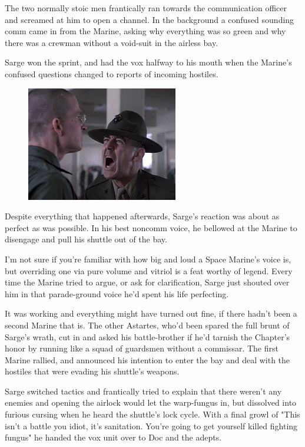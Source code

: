 The two normally stoic men frantically ran towards the communication officer and screamed at him to open a channel. 
In the background a confused sounding comm came in from the Marine, asking why everything was so green and why there was a crewman without a void-suit in the airless bay.

Sarge won the sprint, and had the vox halfway to his mouth when the Marine's confused questions changed to reports of incoming hostiles.
\begin{figure}
	\begin{center}
		\includegraphics[width=\figwidth]{pics/12/16.png}
	\end{center}
\end{figure}
Despite everything that happened afterwards, Sarge's reaction was about as perfect as was possible. 
In his best noncomm voice, he bellowed at the Marine to disengage and pull his shuttle out of the bay. 


I'm not sure if you're familiar with how big and loud a Space Marine's voice is, but overriding one via pure volume and vitriol is a feat worthy of legend. 
Every time the Marine tried to argue, or ask for clarification, Sarge just shouted over him in that parade-ground voice he'd spent his life perfecting. 


It was working and everything might have turned out fine, if there hadn't been a second Marine that is. 
The other Astartes, who'd been spared the full brunt of Sarge's wrath, cut in and asked his battle-brother if he'd tarnish the Chapter's honor by running like a squad of guardsmen without a commissar. 
The first Marine rallied, and announced his intention to enter the bay and deal with the hostiles that were evading his shuttle's weapons.

Sarge switched tactics and frantically tried to explain that there weren't any enemies and opening the airlock would let the warp-fungus in, but dissolved into furious cursing when he heard the shuttle's lock cycle. 
With a final growl of "This isn't a battle you idiot, it's sanitation. 
You're going to get yourself killed fighting fungus" he handed the vox unit over to Doc and the adepts.

